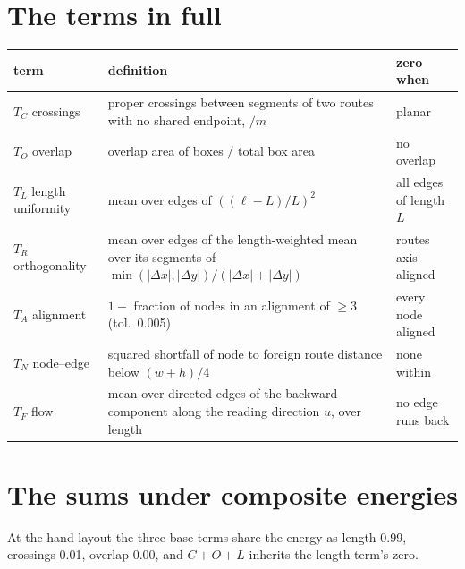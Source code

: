 \documentclass[a4paper,UKenglish]{gd-lipics-v3}
\begin{document}
\appendix
\section{The terms in full}\label{app:terms}



\begin{center}\footnotesize
\begin{tabular}{lp{6.3cm}l}
\toprule
term & definition & zero when \\
\midrule
$T_C$ crossings & proper crossings between segments of two routes with no shared endpoint, $/m$ & planar \\
$T_O$ overlap & overlap area of boxes $/$ total box area & no overlap \\
$T_L$ length uniformity & mean over edges of $((\ell - L)/L)^2$ & all edges of length $L$ \\
$T_R$ orthogonality & mean over edges of the length-weighted mean over its segments of $\min(|\Delta x|,|\Delta y|)/(|\Delta x|+|\Delta y|)$ & routes axis-aligned \\
$T_A$ alignment & $1 -$ fraction of nodes in an alignment of $\ge 3$ (tol.\ 0.005) & every node aligned \\
$T_N$ node--edge & squared shortfall of node to foreign route distance below $(w+h)/4$ & none within \\
$T_F$ flow & mean over directed edges of the backward component along the reading direction $u$, over length & no edge runs back \\
\bottomrule
\end{tabular}
\end{center}

\section{The sums under composite energies}\label{app:sums}

At the hand layout the three base terms share the energy as length 0.99, crossings
0.01, overlap 0.00, and $C+O+L$ inherits the length term's zero.
\end{document}
